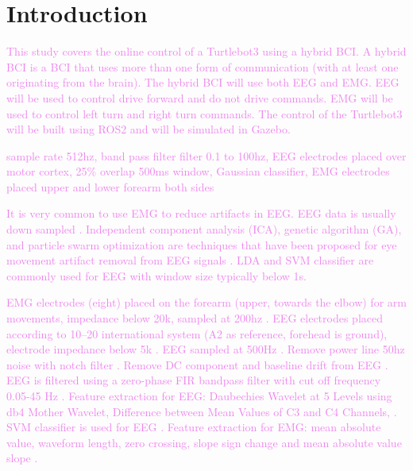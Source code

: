\section{Introduction}
\textcolor{violet}{This study covers the online control of a Turtlebot3 using a hybrid BCI. A hybrid BCI is a BCI that uses more than one form of communication (with at least one originating from the brain)\cite{leebHybridBrainComputer2011}\cite{hongHybridBrainComputer2017}. The hybrid BCI will use both EEG and EMG. EEG will be used to control drive forward and do not drive commands. EMG will be used to control left turn and right turn commands. The control of the Turtlebot3 will be built using ROS2 and will be simulated in Gazebo.}

\textcolor{violet}{sample rate 512hz, band pass filter filter 0.1 to 100hz, EEG electrodes placed over motor cortex, 25\% overlap 500ms window, Gaussian classifier, EMG electrodes placed upper and lower forearm both sides \cite{leebHybridBrainComputer2011}}

\textcolor{violet}{It is very common to use EMG to reduce artifacts in EEG\cite{hongHybridBrainComputer2017}. EEG data is usually down sampled \cite{hongHybridBrainComputer2017}. Independent component analysis (ICA), genetic algorithm (GA), and particle swarm optimization are techniques that have been proposed for eye movement artifact removal from EEG signals \cite{hongHybridBrainComputer2017}. LDA and SVM classifier are commonly used for EEG with window size typically below 1s\cite{hongHybridBrainComputer2017}. }

\textcolor{violet}{EMG electrodes (eight) placed on the forearm (upper, towards the elbow) for arm movements, impedance below 20k, sampled at 200hz \cite{zhangEEGEMGEOGBased2019}. EEG electrodes placed according to 10–20 international system (A2 as reference, forehead is ground), electrode impedance below 5k \cite{zhangEEGEMGEOGBased2019}. EEG sampled at 500Hz \cite{zhangEEGEMGEOGBased2019}. Remove power line 50hz noise with notch filter \cite{zhangEEGEMGEOGBased2019}. Remove DC component and baseline drift from EEG \cite{zhangEEGEMGEOGBased2019}. EEG is filtered using a zero-phase FIR bandpass filter with cut off frequency 0.05-45 Hz \cite{zhangEEGEMGEOGBased2019}. Feature extraction for EEG: Daubechies Wavelet at 5 Levels using db4 Mother Wavelet, Difference between Mean Values of C3 and C4 Channels,  \cite{zhangEEGEMGEOGBased2019}. SVM classifier is used for EEG \cite{zhangEEGEMGEOGBased2019}. Feature extraction for EMG: mean absolute value, waveform length, zero crossing, slope sign change and mean absolute value slope \cite{zhangEEGEMGEOGBased2019}.}

